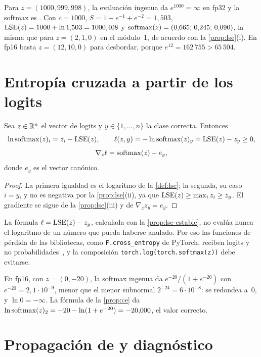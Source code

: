 \begin{ejemplo}\label{ej:lse}
Para $z=(1000,999,998)$, la evaluación ingenua da $e^{1000}=\infty$ en fp32 y la softmax es \NaN. Con $c=1000$, $S=1+e^{-1}+e^{-2}=1{,}503$, $\operatorname{LSE}(z)=1000+\ln 1{,}503=1000{,}408$ y $\operatorname{softmax}(z)=(0{,}665;\,0{,}245;\,0{,}090)$, la misma que para $z=(2,1,0)$ en el módulo~1, de acuerdo con la \cref{prop:lse}(i). En fp16 basta $z=(12,10,0)$ para desbordar, porque $e^{12}=162\,755>65\,504$.
\end{ejemplo}

\section{Entropía cruzada a partir de los logits}

\begin{proposicion}\label{prop:ce}
Sea $z\in\mathbb{R}^{n}$ el vector de logits y $y\in\{1,\dots,n\}$ la clase correcta. Entonces
\[
\ln\operatorname{softmax}(z)_i=z_i-\operatorname{LSE}(z),\qquad \ell(z,y)=-\ln\operatorname{softmax}(z)_y=\operatorname{LSE}(z)-z_y\ge 0,
\]
\[
\nabla_z\ell=\operatorname{softmax}(z)-e_y,
\]
donde $e_y$ es el vector canónico.
\end{proposicion}

\begin{proof}
La primera igualdad es el logaritmo de la \cref{def:lse}; la segunda, su caso $i=y$, y no es negativa por la \cref{prop:lse}(ii), ya que $\operatorname{LSE}(z)\ge\max_iz_i\ge z_y$. El gradiente se sigue de la \cref{prop:lse}(iii) y de $\nabla_zz_y=e_y$.
\end{proof}

La fórmula $\ell=\operatorname{LSE}(z)-z_y$, calculada con la \cref{prop:lse-estable}, no evalúa nunca el logaritmo de un número que pueda haberse anulado. Por eso las funciones de pérdida de las bibliotecas, como \texttt{F.cross\_entropy} de PyTorch, reciben logits y no probabilidades~\cite[§4.5.2]{d2l}, y la composición \texttt{torch.log(torch.softmax(z))} debe evitarse.

\begin{ejemplo}\label{ej:log-cero}
En fp16, con $z=(0,-20)$, la softmax ingenua da $e^{-20}/(1+e^{-20})$ con $e^{-20}=2{,}1\cdot 10^{-9}$, menor que el menor subnormal $2^{-24}=6\cdot 10^{-8}$: se redondea a~0, y $\ln 0=-\infty$. La fórmula de la \cref{prop:ce} da $\ln\operatorname{softmax}(z)_2=-20-\ln(1+e^{-20})=-20{,}000$, el valor correcto.
\end{ejemplo}

\section{Propagación de \texorpdfstring{\NaN}{NaN} y diagnóstico}

